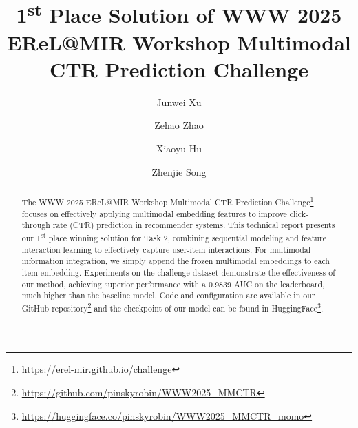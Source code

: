\documentclass[sigconf, nonacm, screen]{acmart}
\begin{document}
\title[MM-CTR: Multimodal CTR Prediction Challenge]{1\textsuperscript{st} Place Solution of WWW 2025 EReL@MIR Workshop Multimodal CTR Prediction Challenge}

\author{Junwei Xu}


\author{Zehao Zhao}


\author{Xiaoyu Hu}


\author{Zhenjie Song}


\renewcommand{\shortauthors}{Junwei Xu et al.}

\begin{abstract}
  The WWW 2025 EReL@MIR Workshop Multimodal CTR Prediction Challenge\footnote{\url{https://erel-mir.github.io/challenge}} focuses on effectively applying multimodal embedding features to improve click-through rate (CTR) prediction in recommender systems. 
  This technical report presents our 1\textsuperscript{st} place winning solution for Task 2, combining sequential modeling and feature interaction learning to effectively capture user-item interactions.
  For multimodal information integration, we simply append the frozen multimodal embeddings to each item embedding.
  Experiments on the challenge dataset demonstrate the effectiveness of our method, achieving superior performance with a 0.9839 AUC on the leaderboard, much higher than the baseline model.
  Code and configuration are available in our GitHub repository\footnote{\url{https://github.com/pinskyrobin/WWW2025_MMCTR}} and the checkpoint of our model can be found in HuggingFace\footnote{\url{https://huggingface.co/pinskyrobin/WWW2025_MMCTR_momo}}.
\end{abstract}
\end{document}
